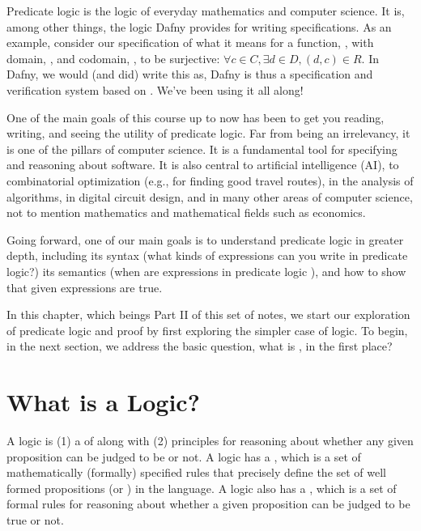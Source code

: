 \documentclass[letterpaper,10pt,english]{sphinxmanual}
\begin{document}
Predicate logic is the logic of everyday mathematics and computer
science. It is, among other things, the logic Dafny provides for
writing specifications.  As an example, consider our specification of
what it means for a function, , with domain, , and codomain,
, to be surjective: \(\forall c \in C, \exists d \in D, (d,c)
\in R\). In Dafny, we would (and did) write this as,  Dafny is thus a
specification and verification system based on . We’ve been using it all along!

One of the main goals of this course up to now has been to get you
reading, writing, and seeing the utility of predicate logic. Far from
being an irrelevancy, it is one of the pillars of computer science. It
is a fundamental tool for specifying and reasoning about software.  It
is also central to artificial intelligence (AI), to combinatorial
optimization (e.g., for finding good travel routes), in the analysis
of algorithms, in digital circuit design, and in many other areas of
computer science, not to mention mathematics and mathematical fields
such as economics.

Going forward, one of our main goals is to understand predicate logic
in greater depth, including its syntax (what kinds of expressions can
you write in predicate logic?) its semantics (when are expressions in
predicate logic ), and how to show that given expressions are
true.

In this chapter, which beings Part II of this set of notes, we start
our exploration of predicate logic and proof by first exploring the
simpler case of  logic.  To begin, in the next section,
we address the basic question, what is , in the first place?


\section{What is a Logic?}
\label{\detokenize{11-propositional-logic:what-is-a-logic}}
A logic is (1) a  of  along with (2)
principles for reasoning about whether any given proposition can be
judged to be  or not. A logic has a , which is a set of
mathematically (formally) specified rules that precisely define the
set of well formed propositions (or )
in the language. A logic also has a , which is a set of
formal rules for reasoning about whether a given proposition can be
judged to be true or not.
\end{document}
